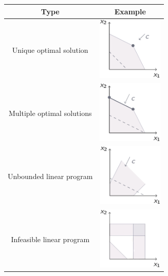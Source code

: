 \begin{table}[H]
    \centering
    \begin{tabular}{cc}
    \hline
    \textbf{Type}              & \textbf{Example}                                                                                                   \\ \hline
    Unique optimal solution    & \begin{minipage}{.2\textwidth}\includegraphics[width=\linewidth, height=30mm]{images/un.png}\end{minipage}         \\ 
    Multiple optimal solutions & \begin{minipage}{.2\textwidth}\includegraphics[width=\linewidth, height=30mm]{images/mul.png}\end{minipage}        \\
    Unbounded linear program   & \begin{minipage}{.2\textwidth}\includegraphics[width=\linewidth, height=30mm]{images/unb.png}\end{minipage}        \\
    Infeasible linear program  & \begin{minipage}{.2\textwidth}\includegraphics[width=\linewidth, height=30mm]{images/in.png}\end{minipage}         \\     
    \hline       
    \end{tabular}
\end{table}